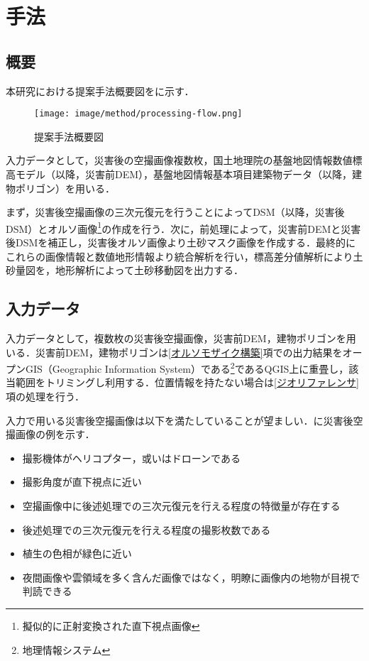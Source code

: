 \chapter{手法}
  \section{概要}
    本研究における提案手法概要図をに示す．

    \begin{figure}[t]
      \centering
      \texttt{[image: image/method/processing-flow.png]}
      \caption{提案手法概要図}
      \label{提案手法概要図}
    \end{figure}
    
    入力データとして，災害後の空撮画像複数枚，国土地理院の基盤地図情報数値標高モデル（以降，災害前DEM），基盤地図情報基本項目建築物データ\cite{基盤地図情報}（以降，建物ポリゴン）を用いる．

    まず，災害後空撮画像の三次元復元を行うことによってDSM（以降，災害後DSM）とオルソ画像\footnote{擬似的に正射変換された直下視点画像}の作成を行う．次に，前処理によって，災害前DEMと災害後DSMを補正し，災害後オルソ画像より土砂マスク画像を作成する．最終的にこれらの画像情報と数値地形情報より統合解析を行い，標高差分値解析により土砂量図を，地形解析によって土砂移動図を出力する．



  \section{入力データ}
    \label{入力データ}
    入力データとして，複数枚の災害後空撮画像，災害前DEM，建物ポリゴンを用いる．災害前DEM，建物ポリゴンは\ref{オルソモザイク構築}項での出力結果をオープンGIS（Geographic Information System）である\footnote{地理情報システム}であるQGIS\cite{QGIS}上に重畳し，該当範囲をトリミングし利用する．位置情報を持たない場合は\ref{ジオリファレンサ}項の処理を行う．

    入力で用いる災害後空撮画像は以下を満たしていることが望ましい．に災害後空撮画像の例を示す．

    \begin{itemize}
      \setlength{\itemsep}{-5pt}
      \item 撮影機体がヘリコプター，或いはドローンである
      \item 撮影角度が直下視点に近い
      \item 空撮画像中に後述処理での三次元復元を行える程度の特徴量が存在する
      \item 後述処理での三次元復元を行える程度の撮影枚数である
      \item 植生の色相が緑色に近い
      \item 夜間画像や雲領域を多く含んだ画像ではなく，明瞭に画像内の地物が目視で判読できる
    \end{itemize}

